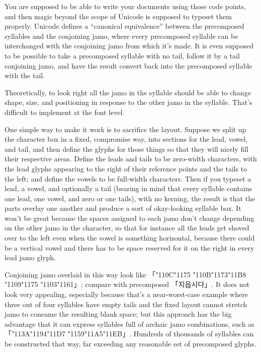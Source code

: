 \documentclass[14pt]{extarticle}
\begin{document}
You are supposed to be able to write your documents using those code points,
and then magic beyond the scope of Unicode is supposed to typeset them
properly.  Unicode defines a ``canonical equivalence'' between the
precomposed syllables and the conjoining jamo, where every precomposed
syllable can be interchanged with the conjoining jamo from which it's made. 
It is even supposed to be possible to take a precomposed syllable with no
tail, follow it by a tail conjoining jamo, and have the result convert back
into the precomposed syllable with the tail.

Theoretically, to look right all the jamo in
the syllable should be able to change shape, size, and positioning in
response to the other jamo in the syllable.  That's difficult to implement
at the font level.

One simple way to make it work is to sacrifice the layout.  Suppose we split
up the character box in a fixed, compromise way, into sections for the lead,
vowel, and tail, and then define the glyphs for those things so that they
will nicely fill their respective areas.  Define the leads and tails to be
zero-width characters, with the lead glyphs appearing to the right of their
reference points and the tails to the left; and define the vowels to be
full-width characters.  Then if you typeset a lead, a vowel, and optionally
a tail (bearing in mind that every syllable contains one lead, one vowel,
and zero or one tails), with no kerning, the result is that the parts
overlay one another and produce a sort of okay-looking syllable box.  It
won't be great because the spaces assigned to each jamo don't change
depending on the other jamo in the character, so that for instance all the
leads get shoved over to the left even when the vowel is something
horizontal, because there could be a vertical vowel and there has to be
space reserved for it on the right in every lead jamo glyph.

Conjoining jamo overlaid in this way look like
{%
「\char"110C\char"1175%
\char"110B\char"1173\char"11B8%
\char"1109\char"1175%
\char"1103\char"1161」}; compare with precomposed {\dodum 「지읍시다」}.  It
does not look very appealing, especially because that's a near-worst-case
example where three out of four syllables have empty tails and the fixed
layout cannot stretch jamo to consume the resulting blank space; but this
approach has the big advantage that it can express syllables full of archaic
jamo combinations, such as {\dodum 「\char"113A\char"1194\char"11D7%
\char"1159\char"11A5\char"11EB」}.  Hundreds of thousands of syllables can
be constructed that way, far exceeding any reasonable set of precomposed
glyphs.
\end{document}
